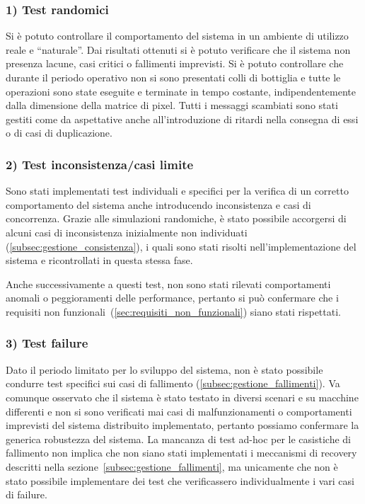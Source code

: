 \documentclass[12pt, a4paper]{report}
\begin{document}
\subsubsection{1) Test randomici}

Si \`e potuto controllare il comportamento del sistema in un ambiente di utilizzo reale e ``naturale''.
Dai risultati ottenuti si \`e potuto verificare che il sistema non presenza lacune, casi critici o fallimenti imprevisti. Si \`e potuto controllare che durante il periodo operativo non si sono presentati colli di bottiglia e tutte le operazioni sono state eseguite e terminate in tempo costante, indipendentemente dalla dimensione della matrice di pixel.
Tutti i messaggi scambiati sono stati gestiti come da aspettative anche all'introduzione di ritardi nella consegna di essi o di casi di duplicazione.

\subsubsection{2) Test inconsistenza/casi limite}

Sono stati implementati test individuali e specifici per la verifica di un corretto comportamento del sistema anche introducendo inconsistenza e casi di concorrenza.
Grazie alle simulazioni randomiche, \`e stato possibile accorgersi di alcuni casi di inconsistenza inizialmente non individuati (\ref{subsec:gestione_consistenza}), i quali sono stati risolti nell'implementazione del sistema e ricontrollati in questa stessa fase.

Anche successivamente a questi test, non sono stati rilevati comportamenti anomali o peggioramenti delle performance, pertanto si pu\`o confermare che i requisiti non funzionali~(\ref{sec:requisiti_non_funzionali}) siano stati rispettati.

\subsubsection{3) Test failure}

Dato il periodo limitato per lo sviluppo del sistema, non \`e stato possibile condurre test specifici sui casi di fallimento (\ref{subsec:gestione_fallimenti}).
Va comunque osservato che il sistema \`e stato testato in diversi scenari e su macchine differenti e non si sono verificati mai casi di malfunzionamenti o comportamenti imprevisti del sistema distribuito implementato, pertanto possiamo confermare la generica robustezza del sistema.
La mancanza di test ad-hoc per le casistiche di fallimento non implica che non siano stati implementati i meccanismi di recovery descritti nella sezione~\ref{subsec:gestione_fallimenti}, ma unicamente che non \`e stato possibile implementare dei test che verificassero individualmente i vari casi di failure.
\end{document}
